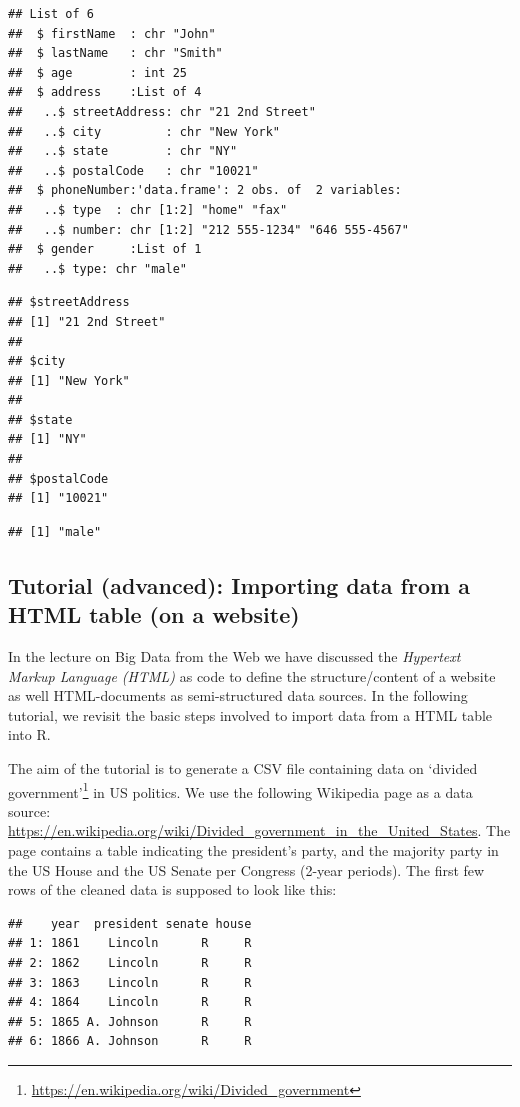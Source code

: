 \documentclass[
  12pt,
]{style/krantz}
\renewcommand{\href}[2]{#2\footnote{\url{#1}}}
\begin{document}
\begin{verbatim}
## List of 6
##  $ firstName  : chr "John"
##  $ lastName   : chr "Smith"
##  $ age        : int 25
##  $ address    :List of 4
##   ..$ streetAddress: chr "21 2nd Street"
##   ..$ city         : chr "New York"
##   ..$ state        : chr "NY"
##   ..$ postalCode   : chr "10021"
##  $ phoneNumber:'data.frame': 2 obs. of  2 variables:
##   ..$ type  : chr [1:2] "home" "fax"
##   ..$ number: chr [1:2] "212 555-1234" "646 555-4567"
##  $ gender     :List of 1
##   ..$ type: chr "male"
\end{verbatim}

\begin{verbatim}
## $streetAddress
## [1] "21 2nd Street"
## 
## $city
## [1] "New York"
## 
## $state
## [1] "NY"
## 
## $postalCode
## [1] "10021"
\end{verbatim}

\begin{verbatim}
## [1] "male"
\end{verbatim}

\hypertarget{tutorial-advanced-importing-data-from-a-html-table-on-a-website}{%
\subsection{Tutorial (advanced): Importing data from a HTML table (on a website)}\label{tutorial-advanced-importing-data-from-a-html-table-on-a-website}}

In the lecture on Big Data from the Web we have discussed the \emph{Hypertext Markup Language (HTML)} as code to define the structure/content of a website as well HTML-documents as semi-structured data sources. In the following tutorial, we revisit the basic steps involved to import data from a HTML table into R.

The aim of the tutorial is to generate a CSV file containing data on \href{https://en.wikipedia.org/wiki/Divided_government}{`divided government'} in US politics. We use the following Wikipedia page as a data source: \url{https://en.wikipedia.org/wiki/Divided_government_in_the_United_States}. The page contains a table indicating the president's party, and the majority party in the US House and the US Senate per Congress (2-year periods). The first few rows of the cleaned data is supposed to look like this:

\begin{verbatim}
##    year  president senate house
## 1: 1861    Lincoln      R     R
## 2: 1862    Lincoln      R     R
## 3: 1863    Lincoln      R     R
## 4: 1864    Lincoln      R     R
## 5: 1865 A. Johnson      R     R
## 6: 1866 A. Johnson      R     R
\end{verbatim}
\end{document}
